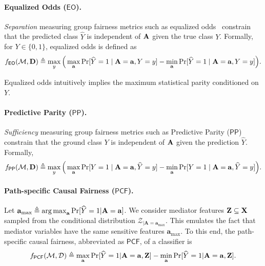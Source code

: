 \paragraph{Equalized Odds ($ \mathsf{EO} $).} \textit{Separation} measuring group fairness metrics such as equalized odds~\cite{hardt2016equality} constrain that the predicted class $ \widehat{Y} $ is independent of $ \mathbf{A} $ given the true class $ Y $.  Formally, for $ Y \in \{0,1\} $, equalized odds is defined as
\[ f_{\mathsf{EO}}(\mathcal{M}, \mathbf{D}) \triangleq  \max_{y} \Big(\max_{\mathbf{a}}\Pr[\widehat{Y} =1 \mid \mathbf{A} = \mathbf{a}, Y = y] - \min_{\mathbf{a}}\Pr[\widehat{Y} =1 \mid \mathbf{A} = \mathbf{a}, Y = y]\Big).
\] 

Equalized odds intuitively implies the maximum statistical parity conditioned on $ Y $.

\paragraph{Predictive Parity ($ \mathsf{PP} $).}
\textit{Sufficiency} measuring group fairness metrics such as Predictive Parity ($ \mathsf{PP} $) constrain that the ground class $ Y $ is independent of $ \mathbf{A} $ given the prediction $ \widehat{Y} $. Formally, 
\begin{align*}
	f_{\mathsf{PP}}(\mathcal{M}, \mathbf{D})  
	\triangleq \max_{y} \Big(\max_{\mathbf{a}}\Pr[Y =1 \mid \mathbf{A} = \mathbf{a}, \widehat{Y} = y] - \min_{\mathbf{a}}\Pr[Y =1 \mid \mathbf{A} = \mathbf{a}, \widehat{Y} = y]\Big).
\end{align*} 


\paragraph{Path-specific Causal Fairness ($ \mathsf{PCF} $).}
Let $ \mathbf{a}_{\max}  \triangleq \operatorname*{arg\,max}_{ \mathbf{a}} \Pr[\widehat{Y} =1 |\mathbf{A}=  \mathbf{a}] $. We consider mediator features $ \mathbf{Z} \subseteq \mathbf{X} $ sampled from the conditional distribution $ {\mathcal{Z}_{|\mathbf{A} = \mathbf{a}_{\max}}} $. This emulates the fact that mediator variables have the same sensitive features $ \mathbf{a}_{\max} $.   To this end, the path-specific causal fairness, abbreviated as $ \mathsf{PCF} $, of a classifier is \[
f_{\mathsf{PCF}}(\mathcal{M}, \mathcal{D}) \triangleq \max_{\mathbf{a}}\Pr[\widehat{Y} = 1 | \mathbf{A} =  \mathbf{a}, \mathbf{Z}] - \min_{\mathbf{a}} \Pr[\widehat{Y} = 1 | \mathbf{A} = \mathbf{a}, \mathbf{Z} ].
\]



